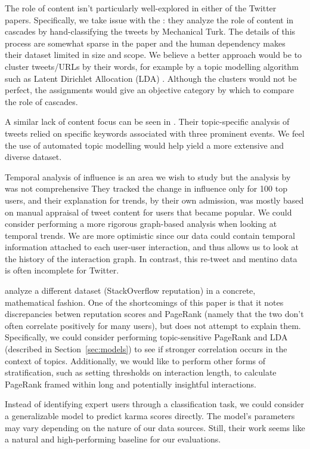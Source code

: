 \documentclass[10pt]{article}
\begin{document}
The role of content isn't particularly well-explored in either of the Twitter papers.
Specifically, we take issue with the \citet{bakshy2011everyone}: they analyze
the role of content in cascades by hand-classifying the tweets by Mechanical Turk.
The details of this process are somewhat sparse in the paper and the human
dependency makes their dataset limited in size and scope. We believe a better
approach would be to cluster tweets/URLs by their words, for example by
a topic modelling algorithm such as Latent Dirichlet Allocation (LDA)
\citep{blei2003latent}. Although the clusters would not be perfect, the assignments
would give an objective category by which to compare the role of cascades.

A similar lack of content focus can be seen in \citet{cha2010measuring}. Their
topic-specific analysis of tweets relied on specific keywords associated with
three prominent events. We feel the use of automated topic modelling would help
yield a more extensive and diverse dataset.

Temporal analysis of influence is an area we wish to study but
the analysis by \citet{cha2010measuring} was not comprehensive
They tracked the change in influence only for 100 top users, and
their explanation for trends, by their own admission, was mostly 
based on manual appraisal of tweet content for users that became popular.
We could consider performing a more rigorous graph-based analysis when looking at temporal
trends. We are more optimistic since our data
could contain temporal information attached to each user-user interaction,
and thus allows us to look at the history of the interaction graph. In contrast, this
re-tweet and mentino data is often incomplete for Twitter.

\citet{movshovitzanalysis} analyze a different dataset (StackOverflow
reputation) in a concrete, mathematical fashion.  One of the shortcomings of
this paper is that it notes discrepancies betwen reputation scores and PageRank
(namely that the two don't often correlate positively for many users), but does
not attempt to explain them. Specifically, we could consider performing
topic-sensitive PageRank and LDA (described in Section~\ref{sec:models}) to see
if stronger correlation occurs in the context of topics.  Additionally, we would
like to perform other forms of stratification, such as setting thresholds on
interaction length, to calculate PageRank framed within long and potentially
insightful interactions.

Instead of identifying expert users through a classification task, we could
consider a generalizable model to predict karma scores directly. The model's
parameters may vary depending on the nature of our data sources. Still, their
work seems like a natural and high-performing baseline for our evaluations. 
\end{document}
